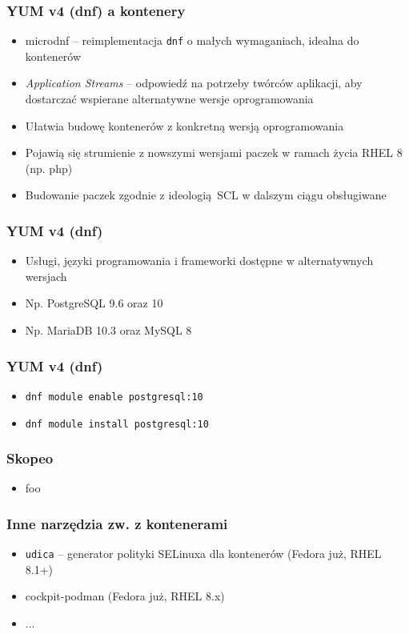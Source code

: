 \documentclass[dvipsnames,table]{beamer}
\begin{document}
\begin{frame}
\frametitle{YUM v4 (dnf) a kontenery}
\begin{itemize}
	\item microdnf -- reimplementacja {\tt dnf} o małych wymaganiach, idealna do kontenerów
	\item {\em Application Streams} -- odpowiedź na potrzeby twórców aplikacji, aby dostarczać wspierane alternatywne wersje oprogramowania
	\item Ułatwia budowę kontenerów z konkretną wersją oprogramowania
	\item Pojawią się strumienie z nowszymi wersjami paczek w ramach życia RHEL 8 (np. php)
	\item Budowanie paczek zgodnie z ideologią SCL w dalszym ciągu obsługiwane
\end{itemize}
\begin{center}
\end{center}
\end{frame}

\begin{frame}
\frametitle{YUM v4 (dnf)}
\begin{itemize}
	\item Usługi, języki programowania i frameworki dostępne w alternatywnych wersjach
	\item Np. PostgreSQL 9.6 oraz 10
	\item Np. MariaDB 10.3 oraz MySQL 8
\end{itemize}
\end{frame}

\begin{frame}
\frametitle{YUM v4 (dnf)}
\begin{itemize}
	\item {\tt dnf module enable postgresql:10}
	\item {\tt dnf module install postgresql:10}
\end{itemize}
%
\end{frame}

\begin{frame}
	\frametitle{Skopeo}
	\begin{itemize}
		\item foo
	\end{itemize}
\end{frame}

\begin{frame}
	\frametitle{Inne narzędzia zw. z kontenerami}
	\begin{itemize}
		\item {\tt udica} -- generator polityki SELinuxa dla kontenerów (Fedora już, RHEL 8.1+)
		\item cockpit-podman (Fedora już, RHEL 8.x)
		\item ...
	\end{itemize}
\end{frame}
\end{document}
